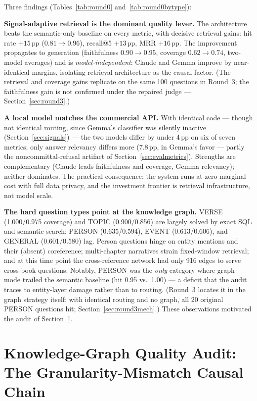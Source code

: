 Three findings (Tables~\ref{tab:round0} and~\ref{tab:round0bytype}):

\textbf{Signal-adaptive retrieval is the dominant quality lever.} The
architecture beats the semantic-only baseline on every metric, with
decisive retrieval gains: hit rate $+15$\,pp ($0.81\to0.96$), recall@5
$+13$\,pp, MRR $+16$\,pp. The improvement propagates to generation
(faithfulness $0.90\to0.95$, coverage $0.62\to0.74$, two-model
averages) and is \emph{model-independent}: Claude and Gemma improve by near-identical
margins, isolating retrieval architecture as the causal factor. (The
retrieval and coverage gains replicate on the same 100 questions in
Round~3; the faithfulness gain is not confirmed under the repaired
judge --- Section~\ref{sec:round3}.)

\textbf{A local model matches the commercial API.} With identical code
--- though not identical routing, since Gemma's classifier was silently
inactive (Section~\ref{sec:signals}) --- the two models differ by under
4\,pp on six of seven metrics;
only answer relevancy differs more (7.8\,pp, in Gemma's favor ---
partly the noncommittal-refusal artifact of
Section~\ref{sec:evalmetrics}). Strengths are complementary (Claude
leads faithfulness and coverage, Gemma relevancy); neither dominates.
The practical consequence: the system runs at zero marginal cost with
full data privacy, and the investment frontier is retrieval
infrastructure, not model scale.

\textbf{The hard question types point at the knowledge graph.} VERSE
(1.000/0.975 coverage) and TOPIC (0.900/0.856) are largely solved by
exact SQL and semantic search; PERSON (0.635/0.594), EVENT
(0.613/0.606), and GENERAL (0.601/0.580) lag. Person questions hinge on
entity mentions and their (absent) coreference; multi-chapter
narratives strain fixed-window retrieval; and at this time point the
cross-reference network had only 916 edges to serve cross-book
questions. Notably, PERSON was the \emph{only} category where graph
mode trailed the semantic baseline (hit 0.95 vs.\ 1.00) --- a deficit
that the audit traces to entity-layer damage rather than to routing.
(Round~3 locates it in the graph strategy itself: with identical routing
and no graph, all 20 original PERSON questions hit;
Section~\ref{sec:round3mech}.)
These observations motivated the audit of Section~\ref{sec:audit}.

\section{Knowledge-Graph Quality Audit: The Granularity-Mismatch Causal
Chain}
\label{sec:audit}


